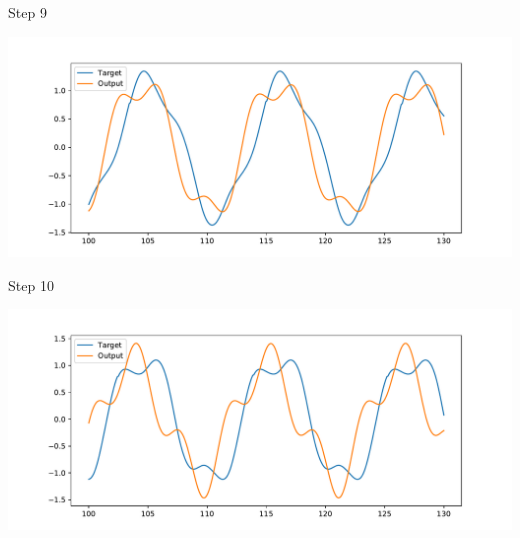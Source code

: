 \documentclass[presentation]{beamer}
\begin{document}
\begin{frame}[label={sec:org28aa33d}]{Step 9}
\begin{center}
\includegraphics[width=.9\linewidth]{./step9.pdf}
\end{center}
\end{frame}
\begin{frame}[label={sec:org66cd61e}]{Step 10}
\begin{center}
\includegraphics[width=.9\linewidth]{./step10.pdf}
\end{center}
\end{frame}
\end{document}
